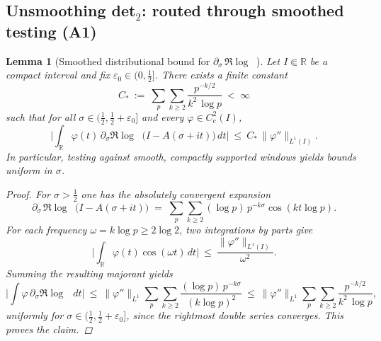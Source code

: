 \documentclass[11pt]{article}
\newtheorem{lemma}[theorem]{Lemma}
\theoremstyle{definition}
\theoremstyle{remark}
\newcommand{\R}{\mathbb{R}}
\DeclareMathOperator{\dettwo}{det_2}
\begin{document}
\subsection*{Unsmoothing det$_2$: routed through smoothed testing (A1)}
\begin{lemma}[Smoothed distributional bound for $\partial_\sigma\,\Re\log\dettwo$]\label{lem:det2-unsmoothed}
Let $I\Subset\R$ be a compact interval and fix $\varepsilon_0\in(0,\tfrac12]$. There exists a finite constant
\[
  C_*\ :=\ \sum_{p}\sum_{k\ge 2}\frac{p^{-k/2}}{k^2\,\log p}\ <\ \infty
\]
such that for all $\sigma\in(\tfrac12,\tfrac12+\varepsilon_0]$ and every $\varphi\in C_c^2(I)$,
\[
  \Big|\int_{\R} \varphi(t)\,\partial_\sigma\Re\log\dettwo\big(I-A(\sigma+it)\big)\,dt\Big|\ \le\ C_*\,\|\varphi''\|_{L^1(I)}.
\]
In particular, testing against smooth, compactly supported windows yields bounds uniform in $\sigma$.
\begin{proof}
For $\sigma>\tfrac12$ one has the absolutely convergent expansion
\[
  \partial_\sigma\,\Re\log\dettwo\big(I-A(\sigma+it)\big)
  \;=\; \sum_{p}\sum_{k\ge 2} (\log p)\,p^{-k\sigma}\cos(k t\log p).
\]
For each frequency $\omega=k\log p\ge 2\log 2$, two integrations by parts give
\[
  \Big|\int_{\R}\!\varphi(t)\cos(\omega t)\,dt\Big|\ \le\ \frac{\|\varphi''\|_{L^1(I)}}{\omega^2}.
\]
Summing the resulting majorant yields
\[
  \Big|\int \varphi\,\partial_\sigma\Re\log\dettwo\,dt\Big|
  \ \le\ \|\varphi''\|_{L^1}\sum_{p}\sum_{k\ge 2}\frac{(\log p)\,p^{-k\sigma}}{(k\log p)^2}
  \ \le\ \|\varphi''\|_{L^1}\sum_{p}\sum_{k\ge 2}\frac{p^{-k/2}}{k^2\,\log p},
\]
uniformly for $\sigma\in(\tfrac12,\tfrac12+\varepsilon_0]$, since the rightmost double series converges. This proves the claim.
\end{proof}



\end{lemma}
\end{document}
